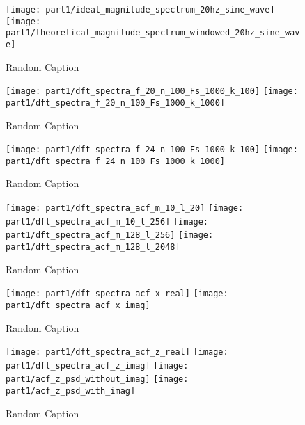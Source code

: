 \begin{figure}[H]
\centering{}
\texttt{[image: part1/ideal\_magnitude\_spectrum\_20hz\_sine\_wave]}
\texttt{[image: part1/theoretical\_magnitude\_spectrum\_windowed\_20hz\_sine\_wave]}
\caption{Random Caption}
\end{figure}


\begin{figure}[H]
\centering{}
\texttt{[image: part1/dft\_spectra\_f\_20\_n\_100\_Fs\_1000\_k\_100]}
\texttt{[image: part1/dft\_spectra\_f\_20\_n\_100\_Fs\_1000\_k\_1000]}
\caption{Random Caption}
\end{figure}

\begin{figure}[H]
\centering{}
\texttt{[image: part1/dft\_spectra\_f\_24\_n\_100\_Fs\_1000\_k\_100]}
\texttt{[image: part1/dft\_spectra\_f\_24\_n\_100\_Fs\_1000\_k\_1000]}
\caption{Random Caption}
\end{figure}

\begin{figure}[H]
\centering{}
\texttt{[image: part1/dft\_spectra\_acf\_m\_10\_l\_20]}
\texttt{[image: part1/dft\_spectra\_acf\_m\_10\_l\_256]}
\texttt{[image: part1/dft\_spectra\_acf\_m\_128\_l\_256]}
\texttt{[image: part1/dft\_spectra\_acf\_m\_128\_l\_2048]}
\caption{Random Caption}
\end{figure}


\begin{figure}[H]
\centering{}
\texttt{[image: part1/dft\_spectra\_acf\_x\_real]}
\texttt{[image: part1/dft\_spectra\_acf\_x\_imag]}
\caption{Random Caption}
\end{figure}


\begin{figure}[H]
\centering{}
\texttt{[image: part1/dft\_spectra\_acf\_z\_real]}
\texttt{[image: part1/dft\_spectra\_acf\_z\_imag]}
\texttt{[image: part1/acf\_z\_psd\_without\_imag]}
\texttt{[image: part1/acf\_z\_psd\_with\_imag]}
\caption{Random Caption}
\end{figure}


